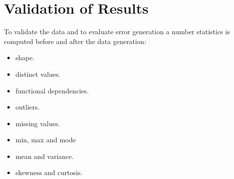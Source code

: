 \section{Validation of Results}



To validate the data and to evaluate error generation a number statistics is computed before and after the data generation:
\begin{itemize}
    \item shape. 
    \item distinct values.
    \item functional dependencies.
    \item outliers.
    \item missing values.
    \item min, max and mode
    \item mean and variance.
    \item skewness and curtosis.
\end{itemize}


